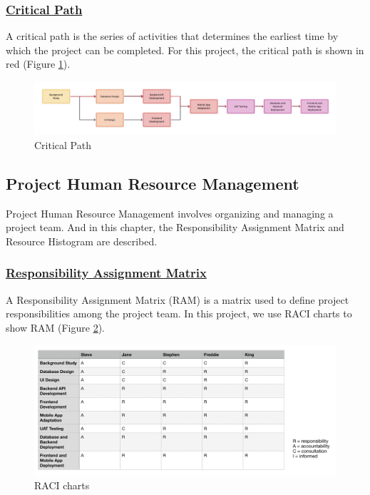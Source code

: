 \documentclass{article}
\begin{document}
\subsubsection*{\underline{Critical Path}}
A critical path is the series of activities that determines the earliest time by which the project can be completed. For this project, the critical path is shown in red (Figure \ref{fig:Critical Path}).
\begin{figure}[!htp]
    \centering
    \includegraphics[width=1\textwidth]{Critical Path.jpg}
    \caption{Critical Path}
    \label{fig:Critical Path}
\end{figure}
\begin{list}{}{\leftmargin=1em}
    \item \subsection*{Project Human Resource Management}
\end{list}
Project Human Resource Management involves organizing and managing a project team. And in this chapter, the Responsibility Assignment Matrix and Resource Histogram are described.\\\subsubsection*{\underline{Responsibility Assignment Matrix}}
A Responsibility Assignment Matrix (RAM) is a matrix used to define project responsibilities among the project team. In this project, we use RACI charts to show RAM (Figure \ref{fig:RACI charts}).
\begin{figure}[!htp]
    \centering
    \includegraphics[width=1\textwidth]{RACI charts.png}
    \caption{RACI charts}
    \label{fig:RACI charts}
\end{figure}
\end{document}
